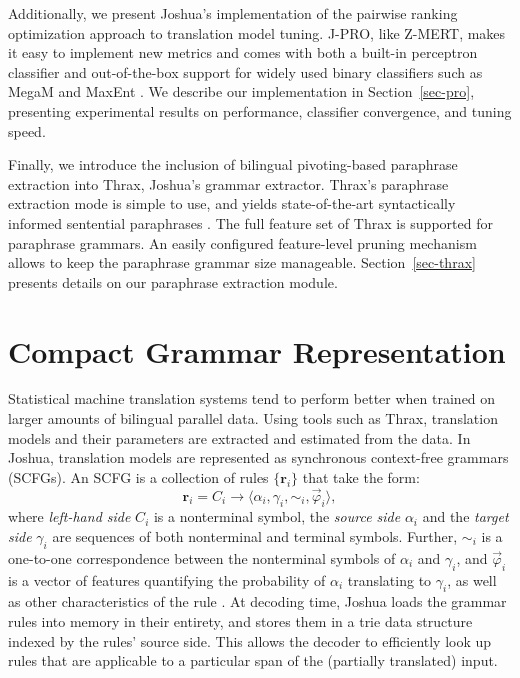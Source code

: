 \documentclass[11pt]{article}
\begin{document}
Additionally, we present Joshua's implementation of the pairwise
ranking optimization \cite{PRO2011} approach to translation model
tuning. J-PRO, like Z-MERT, makes it easy to implement new metrics and
comes with both a built-in perceptron classifier and out-of-the-box
support for widely used binary classifiers such as MegaM and
MaxEnt \cite{MegaM,MaxEnt}. We describe our implementation in
Section~\ref{sec-pro}, presenting experimental results on performance,
classifier convergence, and tuning speed.

Finally, we introduce the inclusion of bilingual pivoting-based
paraphrase extraction into Thrax, Joshua's grammar extractor. Thrax's
paraphrase extraction mode is simple to use, and yields
state-of-the-art syntactically informed sentential paraphrases
\cite{Ganitkevitch2011}. The full feature set of Thrax
\cite{Joshua-3.0} is supported for paraphrase grammars. An easily
configured feature-level pruning mechanism allows to keep the
paraphrase grammar size manageable. Section~\ref{sec-thrax} presents
details on our paraphrase extraction module.

\section{Compact Grammar Representation}
\label{sec-compact-grammar}

Statistical machine translation systems tend to perform better when
trained on larger amounts of bilingual parallel data. Using tools such
as Thrax, translation models and their parameters are extracted and
estimated from the data. In Joshua, translation models are represented
as synchronous context-free grammars (SCFGs). An SCFG is a collection
of rules $\{\mathbf{r}_i\}$ that take the form:
\begin{equation}
 \mathbf{r}_i = C_i \to \langle \alpha_i , \gamma_i , \sim_i, \vec{\varphi}_i \rangle ,
\end{equation}
where \emph{left-hand side} $C_i$ is a nonterminal symbol, the
\emph{source side} $\alpha_i$ and the \emph{target side} $\gamma_i$
are sequences of both nonterminal and terminal symbols. Further,
$\sim_i$ is a one-to-one correspondence between the nonterminal
symbols of $\alpha_i$ and $\gamma_i$, and $\vec{\varphi}_i$ is a
vector of features quantifying the probability of $\alpha_i$
translating to $\gamma_i$, as well as other characteristics of the
rule \cite{Joshua-3.0}. At decoding time, Joshua loads the grammar
rules into memory in their entirety, and stores them in a trie data
structure indexed by the rules' source side. This allows the decoder
to efficiently look up rules that are applicable to a particular span
of the (partially translated) input.
\end{document}
